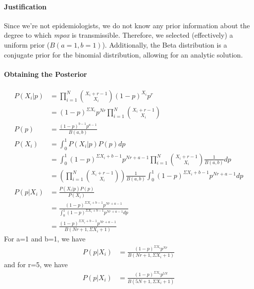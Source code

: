 \paragraph{Justification} 
Since we're not epidemiologists, we do not know any prior information about the degree to which \textit{mpox} is transmissible. Therefore, we selected (effectively) a uniform prior ($B(a=1, b=1)$). Additionally, the Beta distribution is a conjugate prior for the binomial distribution, allowing for an analytic solution.

\paragraph{Obtaining the Posterior}
\begin{align*}
    P(X_i|p) &= \prod_{i=1}^N {X_i + r - 1 \choose X_i}(1-p)^{X_i} p^r\\
    &= (1-p)^{\Sigma X_i} p^{Nr} \prod_{i=1}^N {X_i + r - 1 \choose X_i} \\
    P(p) &= \frac{(1-p)^{b-1}p^{a-1}}{B(a,b)} \\
    P(X_i) &= \int_0^1 P(X_i|p) P(p) dp \\ &= \int_0^1 (1-p)^{\Sigma X_i+b-1} p^{Nr+a-1} \prod_{i=1}^N {X_i + r - 1 \choose X_i} \frac{1}{B(a,b)} dp\\
    &= \left(\prod_{i=1}^N {X_i + r - 1 \choose X_i}\right) \frac{1}{B(a,b)} \int_0^1 (1-p)^{\Sigma X_i+b-1} p^{Nr+a-1} dp\\
    P(p|X_i) &= \frac{P(X_i|p)P(p)}{P(X_i)}\\
    &= \frac{(1-p)^{\Sigma X_i+b-1} p^{Nr+a-1}}{\int_0^1 (1-p)^{\Sigma X_i+b-1} p^{Nr+a-1}dp}\\
    &= \frac{(1-p)^{\Sigma X_i+b-1} p^{Nr+a-1}}{B(Nr+1,\Sigma X_i+1)}
\end{align*}
For a=1 and b=1, we have
\begin{align*}
    P(p|X_i) &= \frac{(1-p)^{\Sigma X_i} p^{Nr}}{B(Nr+1,\Sigma X_i+1)}
\end{align*}
and for r=5, we have
\begin{align*}
    P(p|X_i) &= \frac{(1-p)^{\Sigma X_i} p^{5N}}{B(5N+1,\Sigma X_i+1)}
\end{align*}

